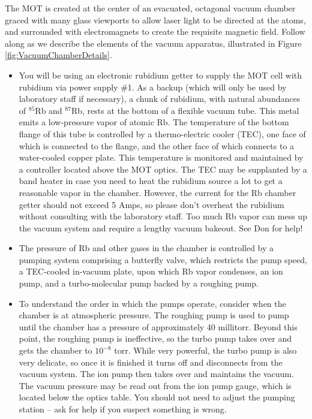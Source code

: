\documentclass{../lab}
\begin{document}
The MOT is created at the center of an evacuated, octagonal vacuum chamber graced with many glass viewports to allow laser light to be directed at the atoms, and surrounded with electromagnets to create the requisite magnetic field. Follow along as we describe the elements of the vacuum apparatus, illustrated in Figure \ref{fig:VacuumChamberDetails}.

\begin{itemize}
    \item You will be using an electronic rubidium getter to supply the MOT cell with rubidium via power supply \#1. As a backup (which will only be used by laboratory staff if necessary), a chunk of rubidium, with natural abundances of $^{85}$Rb and $^{87}$Rb, rests at the bottom of a flexible vacuum tube. This metal emits a low-pressure vapor of atomic Rb. The temperature of the bottom flange of this tube is controlled by a thermo-electric cooler (TEC), one face of which is connected to the flange, and the other face of which connects to a water-cooled copper plate. This temperature is monitored and maintained by a controller located above the MOT optics. The TEC may be supplanted by a band heater in case you need to heat the rubidium source a lot to get a reasonable vapor in the chamber. However, the current for the Rb chamber getter should not exceed 5 Amps, so please don't overheat the rubidium without consulting with the laboratory staff. Too much Rb vapor can mess up the vacuum system and require a lengthy vacuum bakeout. See Don for help!

    \item The pressure of Rb and other gases in the chamber is controlled by a pumping system comprising a butterfly valve, which restricts the pump speed, a TEC-cooled in-vacuum plate, upon which Rb vapor condenses, an ion pump, and a turbo-molecular pump backed by a roughing pump.

    \item To understand the order in which the pumps operate, consider when the chamber is at atmospheric pressure. The roughing pump is used to pump until the chamber has a pressure of approximately 40 millitorr. Beyond this point, the roughing pump is ineffective, so the turbo pump takes over and gets the chamber to $10^{-8}$ torr. While very powerful, the turbo pump is also very delicate, so once it is finished it turns off and disconnects from the vacuum system. The ion pump then takes over and maintains the vacuum. The vacuum pressure may be read out from the ion pump gauge, which is located below the optics table. You should not need to adjust the pumping station – ask for help if you suspect something is wrong.


\end{itemize}
\end{document}
